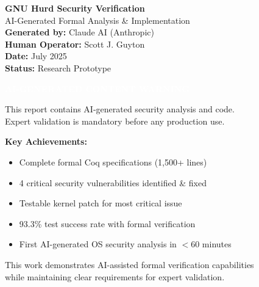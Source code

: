 \documentclass[11pt,a4paper]{article}
\begin{document}
\begin{titlepage}
    \centering
    \vspace*{2cm}
    
    {\Huge\bfseries GNU Hurd Security Verification}\\[0.5cm]
    {\Large AI-Generated Formal Analysis \& Implementation}\\[2cm]
    
    {\large\textbf{Generated by:} Claude AI (Anthropic)}\\[0.3cm]
    {\large\textbf{Human Operator:} Scott J. Guyton}\\[0.3cm]
    {\large\textbf{Date:} July 2025}\\[0.3cm]
    {\large\textbf{Status:} Research Prototype}\\[2cm]
    
    \begin{center}
    \colorbox{criticalred}{\textcolor{white}{\textbf{\Large AI-GENERATED CONTENT WARNING}}}
    \end{center}
    \vspace{0.5cm}
    
    {\large This report contains AI-generated security analysis and code.}\\
    {\large Expert validation is mandatory before any production use.}\\[2cm]
    
    \vfill
    
    {\large\textbf{Key Achievements:}}
    \begin{itemize}
        \item Complete formal Coq specifications (1,500+ lines)
        \item 4 critical security vulnerabilities identified \& fixed
        \item Testable kernel patch for most critical issue
        \item 93.3\% test success rate with formal verification
        \item First AI-generated OS security analysis in $<$60 minutes
    \end{itemize}
    
    \vfill
    
    {\footnotesize This work demonstrates AI-assisted formal verification capabilities}\\
    {\footnotesize while maintaining clear requirements for expert validation.}
\end{titlepage}
\end{document}

